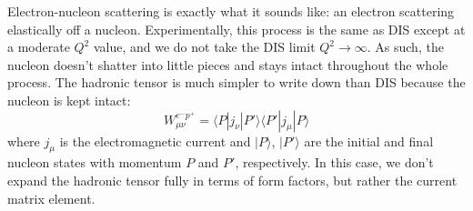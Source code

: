 \documentclass[11pt, oneside]{article}   	%
\theoremstyle{definition}
\begin{document}
Electron-nucleon scattering is exactly what it sounds like: an electron scattering elastically off a nucleon. Experimentally, this process is 
the same as DIS except at a moderate $Q^2$ value, and we do not take the DIS limit $Q^2\rightarrow\infty$. As such, the nucleon doesn't 
shatter into little pieces and stays intact throughout the whole process. The hadronic tensor is much simpler to write down than DIS because 
the nucleon is kept intact:
\begin{equation}
	W_{\mu\nu}^{e^-p^+} = \langle P | j_\nu | P'\rangle \langle P' | j_\mu | P\rangle
\end{equation}
where $j_\mu$ is the electromagnetic current and $|P\rangle$, $|P'\rangle$ are the initial and final nucleon states with momentum $P$ and 
$P'$, respectively. In this case, we don't expand the hadronic tensor fully in terms of form factors, but rather the current matrix element. 
\end{document}
